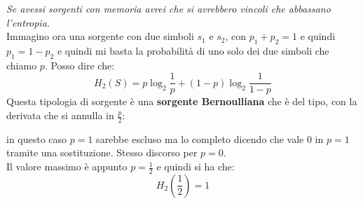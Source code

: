 \documentclass[a4paper,12pt, oneside]{book}
\begin{document}
\textit{Se avessi sorgenti con memoria avrei che si avrebbero vincoli che
  abbassano l'entropia.} \\

Immagino ora una sorgente con due simboli $s_1$ e $s_2$, con $p_1+p_2=1$ e
quindi $p_1=1-p_2$ e quindi mi basta la probabilità di uno solo dei due simboli
che chiamo $p$. Posso dire che:
\[H_2(S)=p\log_2\frac{1}{p}+(1-p)\log_2\frac{1}{1-p}\]
Questa tipologia di sorgente è una \textbf{sorgente Bernoulliana} che è del
tipo, con la derivata che si annulla in $\frac{p}{2}$:
\begin{figure}[H]
  \centering
\end{figure}
in questo caso $p=1$ sarebbe escluso ma lo completo dicendo che vale 0 in $p=1$
tramite una sostituzione. Stesso discorso per $p=0$. \\
Il valore massimo è appunto $p=\frac{1}{2}$ e quindi si ha che:
\[H_2\left(\frac{1}{2}\right)=1\]
\end{document}
